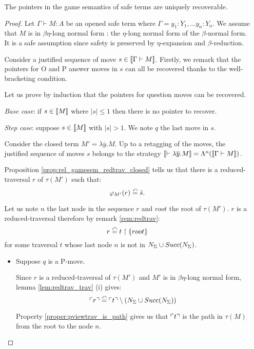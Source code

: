 \begin{prop}
The pointers in the game semantics of safe terms are
uniquely recoverable.
\end{prop}

\begin{proof}
Let $\Gamma \vdash M : A$ be an opened safe term where $\Gamma = y_1:Y_1, \ldots y_n:Y_n$.
We assume that $M$ is in $\beta \eta$-long normal form : the $\eta$-long normal form of the $\beta$-normal form.
It is a safe assumption since safety is preserved by $\eta$-expansion and $\beta$-reduction.

Consider a justified sequence of move $s \in {[\![\Gamma \vdash M ]\!]}$. Firstly,
we remark that the pointers for O and P answer moves in $s$ can all be
recovered thanks to the well-bracketing condition.

Let us prove by induction that the pointers for question moves can be recovered.

\emph{Base case}: if $s \in {[\![M ]\!]}$ where $|s| \leq 1$ then there is no pointer to recover.

\emph{Step case}: suppose $s \in {[\![M ]\!]}$ with $|s| > 1$. We note $q$ the last move in $s$.

Consider the closed term $M'  = \lambda \overline{y} . M$.
Up to a retagging of the moves, the justified sequence of moves $s$ belongs to the strategy
${[\![ \vdash \lambda \overline{y} . M ]\!]} = \Lambda^n({[\![ \Gamma \vdash M ]\!]})$.

Proposition \ref{prop:rel_gamesem_redtrav_closed} tells us that
there is a reduced-traversal $r$ of $\tau(M')$ such that:
$$\varphi_{M'}(r) \stackrel{\curvearrowleft}{=} \tilde{s}.$$

Let us note $n$ the last node in the sequence $r$
and $root$ the root of $\tau(M')$.
$r$ is a reduced-traversal therefore by remark \ref{rem:redtrav}:
$$ r \stackrel{\curvearrowleft}{=} t \upharpoonright \{ root \} $$
for some traversal $t$ whose last node $n$ is not in $N_\Sigma \cup Succ(N_\Sigma)$.

\begin{itemize}
\item Suppose $q$ is a P-move.

Since $r$ is a reduced-traversal of $\tau(M')$ and $M'$ is in $\beta
\eta$-long normal form, lemma \ref{lem:redtrav_trav} (i) gives:
\begin{equation}
 \ulcorner r \urcorner \stackrel{\curvearrowleft}{=} \ulcorner t \urcorner \setminus \left( N_\Sigma \cup Succ(N_\Sigma) \right) \label{eq:pview_r}
\end{equation}


Property \ref{proper:pviewtrav_is_path} gives us that $\ulcorner t \urcorner$ is
the path in $\tau(M)$ from the root to the node $n$.


\end{itemize}
\end{proof}

